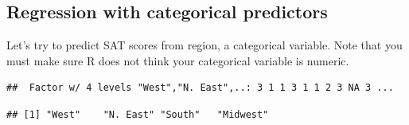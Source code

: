 \documentclass[]{book}
\newenvironment{Shaded}{\begin{snugshade}}{\end{snugshade}}
\newcommand{\CommentTok}[1]{\textcolor[rgb]{0.56,0.35,0.01}{\textit{#1}}}
\newcommand{\DataTypeTok}[1]{\textcolor[rgb]{0.13,0.29,0.53}{#1}}
\newcommand{\DecValTok}[1]{\textcolor[rgb]{0.00,0.00,0.81}{#1}}
\newcommand{\KeywordTok}[1]{\textcolor[rgb]{0.13,0.29,0.53}{\textbf{#1}}}
\newcommand{\NormalTok}[1]{#1}
\newcommand{\OperatorTok}[1]{\textcolor[rgb]{0.81,0.36,0.00}{\textbf{#1}}}
\newcommand{\StringTok}[1]{\textcolor[rgb]{0.31,0.60,0.02}{#1}}
\begin{document}
\hypertarget{regression-with-categorical-predictors}{%
\subsection{Regression with categorical predictors}\label{regression-with-categorical-predictors}}

Let's try to predict SAT scores from region, a categorical variable.
Note that you must make sure R does not think your categorical variable is numeric.

\begin{Shaded}
\end{Shaded}

\begin{verbatim}
##  Factor w/ 4 levels "West","N. East",..: 3 1 1 3 1 1 2 3 NA 3 ...
\end{verbatim}

\begin{Shaded}
\end{Shaded}

\begin{verbatim}
## [1] "West"    "N. East" "South"   "Midwest"
\end{verbatim}

\begin{Shaded}
\end{Shaded}
\end{document}
